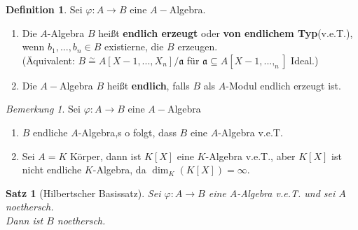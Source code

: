 \documentclass[10pt,a4paper]{article}
\newcommand{\isomorph}{\ensuremath{\overset{\sim}{=}}}
\newcounter{thm}[section]
\theoremstyle{definition}
\newtheorem{definition}[thm]{Definition}
\theoremstyle{plain}
\newtheorem{satz}[thm]{Satz}
\theoremstyle{remark}
\newtheorem{bem}[thm]{Bemerkung}
\begin{document}
\begin{definition}
	Sei $\varphi: A\rightarrow B$ eine $A-$Algebra.\\
	\begin{enumerate}
		\item Die $A$-Algebra $B$ heißt \textbf{endlich erzeugt} oder \textbf{von endlichem Typ}(v.e.T.), wenn $b_1,...,b_n\in B$ existierne, die $B$ erzeugen.\\
		(Äquivalent: $B\isomorph A[X-1,...,X_n]/\mathfrak a$ für $\mathfrak a\subseteq A[X-1,...,_n]$ Ideal.)
		
		\item Die $A-$Algebra $B$ heißt \textbf{endlich}, falls $B$ als $A$-Modul endlich erzeugt ist.
	\end{enumerate}
\end{definition}
\begin{bem}
	Sei $\varphi:A\rightarrow B$ eine $A-$Algebra\begin{enumerate}
		\item $B$ endliche $A$-Algebra,s o folgt, dass $B$ eine $A$-Algebra v.e.T.
		\item Sei $A=K$ Körper, dann ist $K[X]$ eine $K$-Algebra v.e.T., aber $K[X]$ ist nicht endliche $K$-Algebra, da $\dim_K(K[X])=\infty$.
	\end{enumerate}
\end{bem}
\begin{satz}[Hilbertscher Basissatz]
	Sei $\varphi:A\rightarrow B$ eine $A$-Algebra v.e.T. und sei $A$ noethersch.\\
	Dann ist $B$ noethersch.
\end{satz}
\end{document}
